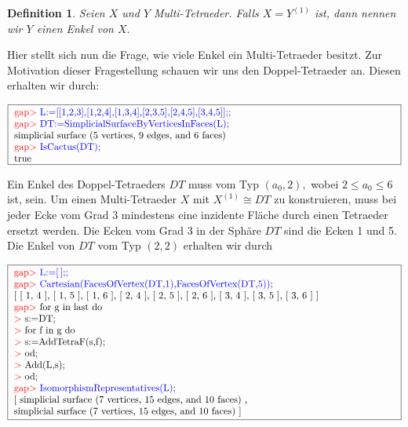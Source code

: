 \documentclass[12pt,titlepage,twoside,cleardoublepage]{article}
\theoremstyle{nummermitklammern}
\newtheorem{definition}[temp]{Definition}
\newtheorem{definition}[zahl]{Definition}
\numberwithin{equation}{section}
\begin{document}
\begin{definition}
Seien $X$ und $Y$ Multi-Tetraeder. Falls $X=Y^{(1)}$ ist, dann nennen wir $Y$ einen \emph{Enkel} von $X.$ 
\end{definition}

Hier stellt sich nun die Frage, wie viele Enkel ein Multi-Tetraeder besitzt. 
Zur Motivation dieser Fragestellung schauen wir uns den Doppel-Tetraeder an.
Diesen erhalten wir durch:
\begin{center}
 $\fbox{
\parbox{14cm}{
\textcolor{red}{gap$>$} \textcolor{blue}{L:=[[1,2,3],[1,2,4],[1,3,4],[2,3,5],[2,4,5],[3,4,5]];;}\newline
\textcolor{red}{gap$>$} \textcolor{blue}{DT:=SimplicialSurfaceByVerticesInFaces(L);}\newline
simplicial surface (5 vertices, 9 edges, and 6 faces)\newline
\textcolor{red}{gap$>$} \textcolor{blue}{IsCactus(DT);}\newline
true
}}$
\end{center}
Ein Enkel des Doppel-Tetraeders $DT$ muss vom Typ $(a_0,2),$ wobei $2\leq a_0 \leq 6$ ist, sein.
Um einen Multi-Tetraeder $X$ mit $X^{(1)}\cong DT$ zu konstruieren, muss bei jeder Ecke vom Grad 3 mindestens eine inzidente Fläche durch einen Tetraeder ersetzt werden. Die Ecken vom Grad 3 in der Sphäre $DT$ sind die Ecken 1 und 5. 
Die Enkel von $DT$ vom Typ $(2,2)$ erhalten wir durch
\begin{center}
 $\fbox{
\parbox{14cm}{
\textcolor{red}{gap$>$} \textcolor{blue}{L:=[\,];;}\newline
\textcolor{red}{gap$>$} \textcolor{blue}{Cartesian(FacesOfVertex(DT,1),FacesOfVertex(DT,5));}\newline
[ [ 1, 4 ], [ 1, 5 ], [ 1, 6 ], [ 2, 4 ], [ 2, 5 ], [ 2, 6 ], [ 3, 4 ],
  [ 3, 5 ], [ 3, 6 ] ]\newline
\textcolor{red}{gap$>$} for g in last do\newline
\textcolor{red}{$>$} s:=DT;\newline
\textcolor{red}{$>$} for f in g do\newline
\textcolor{red}{$>$} s:=AddTetraF(s,f);\newline
\textcolor{red}{$>$} od;\newline
\textcolor{red}{$>$} Add(L,s);\newline
\textcolor{red}{$>$} od;\newline
\textcolor{red}{gap$>$} \textcolor{blue}{IsomorphismRepresentatives(L);}\newline
[ simplicial surface (7 vertices, 15 edges, and 10 faces)
    ,\newline
  simplicial surface (7 vertices, 15 edges, and 10 faces)
 ]
 }}$
 \end{center}
\end{document}
